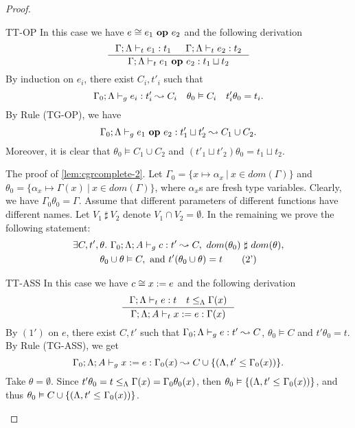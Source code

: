 {{{\begin{proof}
\begin{ProofEnumDesc}
\item[TT-OP] In this case we have $e\cong {e_1}~\textbf{op}~{e_2}$ and the following derivation
\begin{equation*}
\inference
{\Gamma;\trace \vdash_{t} e_1: t_1 & \Gamma;\trace \vdash_{t} e_2: t_2}
{\Gamma;\trace \vdash_{t} \leOP{e_1}{e_2} : t_1\sqcup t_2}
\end{equation*}
By induction on $e_i$, there exist $C_i, t'_i$ such that
\begin{equation*}
\Gamma_{0};\Lambda \vdash_{g} e_i: t'_i\leadsto C_i\quad\theta_{0} \vDash C_i\quad t'_i\theta_{0} = t_i.
\end{equation*}
By Rule {(TG-OP)}, we have
\begin{equation*}
\Gamma_{0};\Lambda \vdash_{g} {e_1}~\textbf{op}~{e_2} : t'_1\sqcup t'_2 \leadsto C_1\cup C_2.
\end{equation*}
Moreover, it is clear that $\theta_{0} \vDash C_1\cup C_2$ and $(t'_1\sqcup t'_2)\theta_{0} = t_1\sqcup t_2 $.
\end{ProofEnumDesc}
The proof of \ref{lem:cgrcomplete-2}.
Let $\Gamma_{0} = \{x \mapsto \alpha_{x} ~|~ x \in dom(\Gamma) \} $
and $\theta_{0} = \{\alpha_{x}\mapsto \Gamma(x)~|~x\in dom(\Gamma)\} $, where $\alpha_x$s are fresh type variables.
Clearly,  we have $\Gamma_{0}\theta_{0} = \Gamma$.
Assume that different parameters of different functions have different names.
Let $V_1 ~\sharp~ V_2 $ denote $V_1\cap V_2 = \emptyset$.
In the remaining we prove the following statement:
\begin{gather*}
\exists C, t',\theta.~\Gamma_{0};\Lambda; A \vdash_{g} c : t' \leadsto C,~ dom(\theta_{0})~\sharp~ dom(\theta),\\
\theta_{0}\cup\theta \vDash C,  \textrm{ and } t'(\theta_{0}\cup\theta) = t \tag{2'}
\end{gather*}
\begin{ProofEnumDesc}
\item[TT-ASS] In this case we have $c\cong  {x}:={e}$ and the following derivation
\begin{equation*}
\inference
{\Gamma;\trace \vdash_{t} e : t \quad   t \leq_{\trace} \Gamma(x) }
{\Gamma;\trace; A \vdash_{t} \lcASS{x}{e} : \Gamma(x)}
\end{equation*}
By $(1')$ on $e$, there exist $C, t'$ such that $\Gamma_{0};\Lambda \vdash_{g} e : t' \leadsto C$,
$\theta_{0} \vDash C$ and $t'\theta_{0} = t$.
By Rule {(TG-ASS)}, we get
\begin{equation*}
\Gamma_{0};\Lambda; A \vdash_{g} {x}:={e} : \Gamma_{0}(x) \leadsto C \cup \{(\Lambda, t'\leq \Gamma_{0}(x)) \}.
\end{equation*}
Take $\theta = \emptyset $.
Since $t'\theta_{0} = t \leq_{\Lambda} \Gamma(x) = \Gamma_{0}\theta_{0}(x)$,
then $\theta_{0} \vDash \{ (\Lambda, t' \leq_{} \Gamma_{0}(x)) \} $,
and thus $\theta_{0} \vDash C \cup  \{ (\Lambda, t' \leq_{} \Gamma_{0}(x)) \} $.



\end{ProofEnumDesc}
\end{proof}}}}

